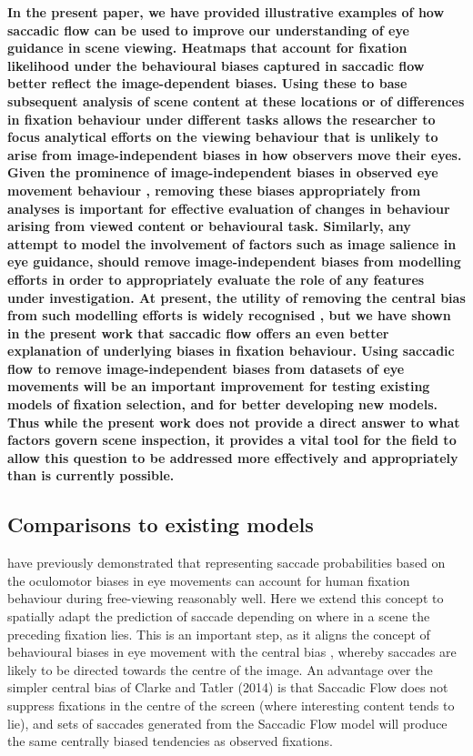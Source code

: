 \documentclass[a4paper, twocolumn, oneside, 11pt]{article}
\begin{document}
\textbf{In the present paper, we have provided illustrative examples of how saccadic flow can be used to improve our understanding of eye guidance in scene viewing. Heatmaps that account for fixation likelihood under the behavioural biases captured in saccadic flow better reflect the image-dependent biases. Using these to base subsequent analysis of scene content at these locations or of differences in fixation behaviour under different tasks allows the researcher to focus analytical efforts on the viewing behaviour that is unlikely to arise from image-independent biases in how observers move their eyes. Given the prominence of image-independent biases in observed eye movement behaviour \cite{tatler-vincent2009}, removing these biases appropriately from analyses is important for effective evaluation of changes in behaviour arising from viewed content or behavioural task. Similarly, any attempt to model the involvement of factors such as image salience in eye guidance, should remove image-independent biases from modelling efforts in order to appropriately evaluate the role of any features under investigation. At present, the utility of removing the central bias from such modelling efforts is widely recognised \cite{borji2013,Tatler2011}, but we have shown in the present work that saccadic flow offers an even better explanation of underlying biases in fixation behaviour. Using saccadic flow to remove image-independent biases from datasets of eye movements will be an important improvement for testing existing models of fixation selection, and for better developing new models. Thus while the present work does not provide a direct answer to what factors govern scene inspection, it provides a vital tool for the field to allow this question to be addressed more effectively and appropriately than is currently possible.}

\subsection{Comparisons to existing models}
\citet{tatler-vincent2009} have previously demonstrated that representing saccade probabilities based on the oculomotor biases in eye movements can account for human fixation behaviour during free-viewing reasonably well. Here we extend this concept to spatially adapt the prediction of saccade depending on where in a scene the preceding fixation lies. This is an important step, as it aligns the concept of behavioural biases in eye movement with the central bias \citep{tatler2007}, whereby saccades are likely to be directed towards the centre of the image. An advantage over the simpler central bias of Clarke and Tatler (2014) is that Saccadic Flow does not suppress fixations in the centre of the screen (where interesting content tends to lie), and sets of saccades generated from the Saccadic Flow model will produce the same centrally biased tendencies as observed fixations.
\end{document}
